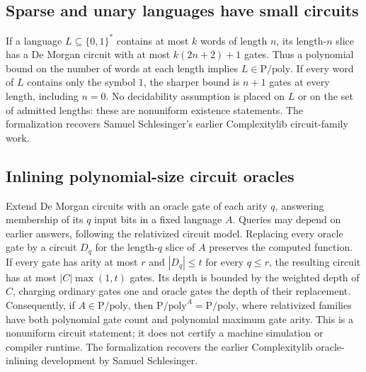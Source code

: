 \begin{result}
\subsection{Sparse and unary languages have small circuits}
If a language $L\subseteq\{0,1\}^*$ contains at most $k$ words of length $n$,
its length-$n$ slice has a De Morgan circuit with at most $k(2n+2)+1$ gates.
Thus a polynomial bound on the number of words at each length implies
$L\in\mathrm{P/poly}$. If every word of $L$ contains only the symbol $1$,
the sharper bound is $n+1$ gates at every length, including $n=0$.
No decidability assumption is placed on $L$ or on the set of admitted lengths:
these are nonuniform existence statements.\citep{AroraBarak09}
The formalization recovers Samuel Schlesinger's earlier Complexitylib circuit-family work.
\end{result}

\begin{result}
\subsection{Inlining polynomial-size circuit oracles}
Extend De Morgan circuits with an oracle gate of each arity $q$, answering membership
of its $q$ input bits in a fixed language $A$. Queries may depend on earlier answers,
following the relativized circuit model.\citep{Wilson1985}
Replacing every oracle gate by a circuit $D_q$ for the length-$q$ slice of $A$
preserves the computed function. If every gate has arity at most $r$ and
$|D_q|\le t$ for every $q\le r$, the resulting circuit has at most
$|C|\max(1,t)$ gates. Its depth is bounded by the weighted depth of $C$, charging
ordinary gates one and oracle gates the depth of their replacement.
Consequently, if $A\in\mathrm{P/poly}$, then
$\mathrm{P/poly}^{A}=\mathrm{P/poly}$, where relativized families have both
polynomial gate count and polynomial maximum gate arity. This is a nonuniform
circuit statement; it does not certify a machine simulation or compiler runtime.
The formalization recovers the earlier Complexitylib oracle-inlining development
by Samuel Schlesinger.
\end{result}

